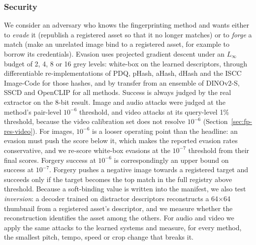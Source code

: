 \subsubsection{Security}
We consider an adversary who knows the fingerprinting method and wants either to \emph{evade} it (republish a registered asset so that it no longer matches) or to \emph{forge} a match (make an unrelated image bind to a registered asset, for example to borrow its credentials). Evasion uses projected gradient descent \cite{madry2018pgd} under an $L_\infty$ budget of 2, 4, 8 or 16 grey levels: white-box on the learned descriptors, through differentiable re-implementations of PDQ, pHash, aHash, dHash and the ISCC Image-Code for those hashes, and by transfer from an ensemble of DINOv2-S, SSCD and OpenCLIP for all methods. Success is always judged by the real extractor on the 8-bit result. Image and audio attacks were judged at the method's pair-level $10^{-6}$ threshold, and video attacks at its query-level 1\% threshold, because the video calibration set does not resolve $10^{-6}$ (Section~\ref{sec:fp-res-video}). For images, $10^{-6}$ is a looser operating point than the headline: an evasion must push the score below it, which makes the reported evasion rates conservative, and we re-score white-box evasions at the $10^{-7}$ threshold from their final scores. Forgery success at $10^{-6}$ is correspondingly an upper bound on success at $10^{-7}$. Forgery pushes a negative image towards a registered target and succeeds only if the target becomes the top match in the full registry above threshold. Because a soft-binding value is written into the manifest, we also test \emph{inversion}: a decoder trained on distractor descriptors reconstructs a 64$\times$64 thumbnail from a registered asset's descriptor, and we measure whether the reconstruction identifies the asset among the others. For audio and video we apply the same attacks to the learned systems and measure, for every method, the smallest pitch, tempo, speed or crop change that breaks it.

